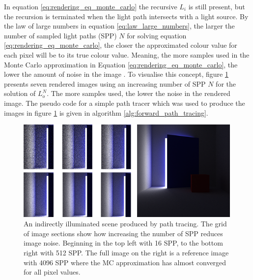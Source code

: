 \documentclass[../dissertation.tex]{subfiles}
\begin{document}
In equation \ref{eq:rendering_eq_monte_carlo} the recursive $L_i$ is still present, but the recursion is terminated when the light path intersects with a light source. By the law of large numbers in equation \ref{eq:law_large_numbers}, the larger the number of sampled light paths (SPP) $N$ for solving equation \ref{eq:rendering_eq_monte_carlo}, the closer the approximated colour value for each pixel will be to its true colour value. Meaning, the more samples used in the Monte Carlo approximation in Equation \ref{eq:rendering_eq_monte_carlo}, the lower the amount of noise in the image \cite{christensen2016path}. To visualise this concept, figure \ref{fig:reduce_noise_spp_example} presents seven rendered images using an increasing number of SPP $N$ for the solution of $L_o^N$. The more samples used, the lower the noise in the rendered image. The pseudo code for a simple path tracer which was used to produce the images in figure \ref{fig:reduce_noise_spp_example} is given in algorithm \ref{alg:forward_path_tracing}.

\begin{figure}[h]
\begin{center}
\includegraphics[width=0.99\textwidth]{images/renders/noise_reduction_default/increasing_samples.png}    
\end{center}
\caption{An indirectly illuminated scene produced by path tracing. The grid of image sections show how increasing the number of SPP reduces image noise. Beginning in the top left with 16 SPP, to the bottom right with 512 SPP. The full image on the right is a reference image with 4096 SPP where the MC approximation has almost converged for all pixel values.}
\label{fig:reduce_noise_spp_example}
\end{figure}
\end{document}
